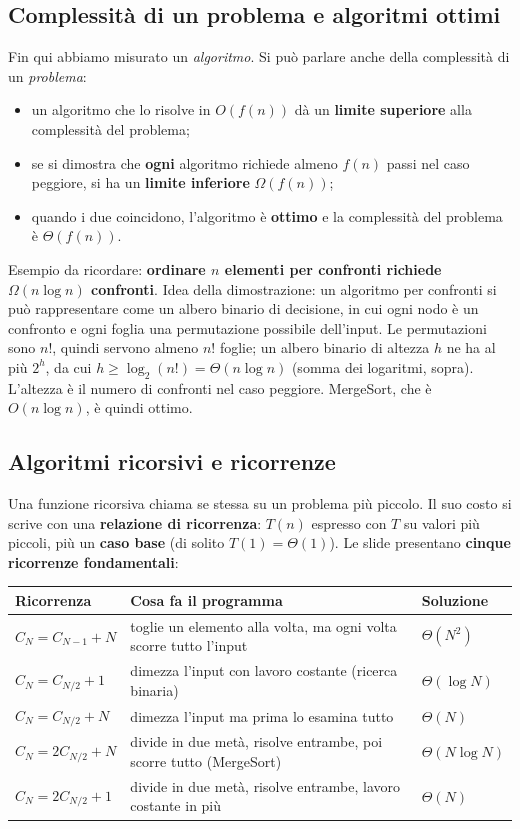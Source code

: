 \subsection*{Complessità di un problema e algoritmi ottimi}

Fin qui abbiamo misurato un \emph{algoritmo}. Si può parlare anche della complessità
di un \emph{problema}:
\begin{itemize}
  \item un algoritmo che lo risolve in $O(f(n))$ dà un \textbf{limite superiore}
        alla complessità del problema;
  \item se si dimostra che \textbf{ogni} algoritmo richiede almeno $f(n)$ passi nel
        caso peggiore, si ha un \textbf{limite inferiore} $\Omega(f(n))$;
  \item quando i due coincidono, l'algoritmo è \textbf{ottimo} e la complessità del
        problema è $\Theta(f(n))$.
\end{itemize}
Esempio da ricordare: \textbf{ordinare $n$ elementi per confronti richiede
$\Omega(n \log n)$ confronti}. Idea della dimostrazione: un algoritmo per confronti si
può rappresentare come un albero binario di decisione, in cui ogni nodo è un confronto
e ogni foglia una permutazione possibile dell'input. Le permutazioni sono $n!$, quindi
servono almeno $n!$ foglie; un albero binario di altezza $h$ ne ha al più $2^h$, da cui
$h \ge \log_2(n!) = \Theta(n \log n)$ (somma dei logaritmi, sopra). L'altezza è il
numero di confronti nel caso peggiore. MergeSort, che è $O(n \log n)$, è quindi ottimo.

\subsection*{Algoritmi ricorsivi e ricorrenze}

Una funzione ricorsiva chiama se stessa su un problema più piccolo. Il suo costo si
scrive con una \textbf{relazione di ricorrenza}: $T(n)$ espresso con $T$ su valori
più piccoli, più un \textbf{caso base} (di solito $T(1) = \Theta(1)$). Le slide
presentano \textbf{cinque ricorrenze fondamentali}:

\begin{center}\small
\begin{tabular}{p{3.1cm}p{6.6cm}l}
\toprule
\textbf{Ricorrenza} & \textbf{Cosa fa il programma} & \textbf{Soluzione} \\
\midrule
$C_N = C_{N-1} + N$   & toglie un elemento alla volta, ma ogni volta scorre tutto l'input & $\Theta(N^2)$ \\
$C_N = C_{N/2} + 1$   & dimezza l'input con lavoro costante (ricerca binaria) & $\Theta(\log N)$ \\
$C_N = C_{N/2} + N$   & dimezza l'input ma prima lo esamina tutto & $\Theta(N)$ \\
$C_N = 2C_{N/2} + N$  & divide in due metà, risolve entrambe, poi scorre tutto (MergeSort) & $\Theta(N \log N)$ \\
$C_N = 2C_{N/2} + 1$  & divide in due metà, risolve entrambe, lavoro costante in più & $\Theta(N)$ \\
\bottomrule
\end{tabular}
\end{center}


